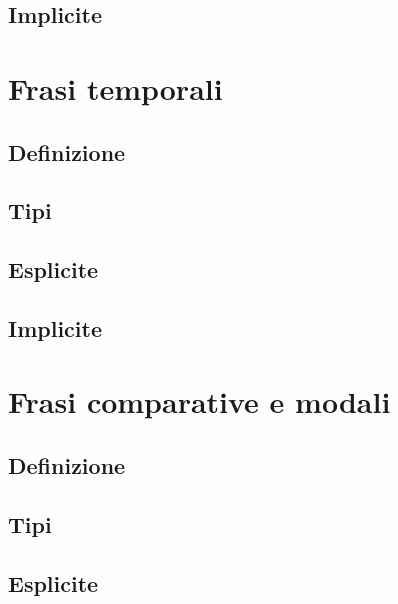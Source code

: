 \documentclass[a4paper,twoside,11pt,chapterprefix=false,bibliography=totocnumbered,listof=flat]{scrbook}
\begin{document}
\hypertarget{implicite-1}{%
\section{Implicite}\label{implicite-1}}

\hypertarget{frasi-temporali}{%
\chapter{Frasi temporali}\label{frasi-temporali}}

\hypertarget{definizione}{%
\section{Definizione}\label{definizione}}

\hypertarget{tipi-1}{%
\section{Tipi}\label{tipi-1}}

\hypertarget{esplicite-2}{%
\section{Esplicite}\label{esplicite-2}}

\hypertarget{implicite-2}{%
\section{Implicite}\label{implicite-2}}

\hypertarget{frasi-comparative-e-modali}{%
\chapter{Frasi comparative e modali}\label{frasi-comparative-e-modali}}

\hypertarget{definizione-1}{%
\section{Definizione}\label{definizione-1}}

\hypertarget{tipi-2}{%
\section{Tipi}\label{tipi-2}}

\hypertarget{esplicite-3}{%
\section{Esplicite}\label{esplicite-3}}
\end{document}
